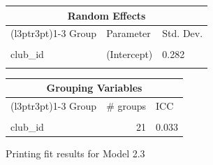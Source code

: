 \documentclass[
  12pt]{article}
\begin{document}
\begin{table}[!h]
\centering
\begin{tabular}{lll}
\toprule
\multicolumn{3}{c}{Random Effects} \\
\cmidrule(l{3pt}r{3pt}){1-3}
Group & Parameter & Std. Dev.\\
\midrule
\cellcolor{gray!10}{player\_id} & \cellcolor{gray!10}{(Intercept)} & \cellcolor{gray!10}{1.343}\\
club\_id & (Intercept) & 0.282\\
\cellcolor{gray!10}{Residual} & \cellcolor{gray!10}{} & \cellcolor{gray!10}{0.708}\\
\bottomrule
\end{tabular}
\end{table} \begin{table}[!h]
\centering
\begin{tabular}{lrl}
\toprule
\multicolumn{3}{c}{Grouping Variables} \\
\cmidrule(l{3pt}r{3pt}){1-3}
Group & \# groups & ICC\\
\midrule
\cellcolor{gray!10}{player\_id} & \cellcolor{gray!10}{2159} & \cellcolor{gray!10}{0.757}\\
club\_id & 21 & 0.033\\
\bottomrule
\end{tabular}
\end{table}

\newpage

Printing fit results for Model 2.3
\end{document}
